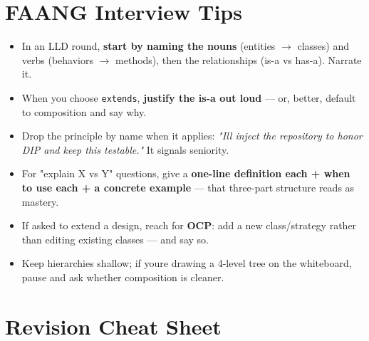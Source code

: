 \documentclass[11pt]{article}
\providecommand{\tightlist}{\setlength{\itemsep}{1pt}\setlength{\parskip}{0pt}}
\begin{document}
\section{FAANG Interview Tips}\label{faang-interview-tips}

\begin{itemize}
\tightlist
\item
  In an LLD round, \textbf{start by naming the nouns} (entities \(\rightarrow\) classes) and verbs (behaviors \(\rightarrow\) methods), then the relationships (is-a vs has-a). Narrate it.
\item
  When you choose \texttt{extends}, \textbf{justify the is-a out loud} --- or, better, default to composition and say why.
\item
  Drop the principle by name when it applies: \emph{"I\textquotesingle ll inject the repository to honor DIP and keep this testable."} It signals seniority.
\item
  For "explain X vs Y" questions, give a \textbf{one-line definition each + when to use each + a concrete example} --- that three-part structure reads as mastery.
\item
  If asked to extend a design, reach for \textbf{OCP}: add a new class/strategy rather than editing existing classes --- and say so.
\item
  Keep hierarchies shallow; if you\textquotesingle re drawing a 4-level tree on the whiteboard, pause and ask whether composition is cleaner.
\end{itemize}

\section{Revision Cheat Sheet}\label{revision-cheat-sheet}
\end{document}
